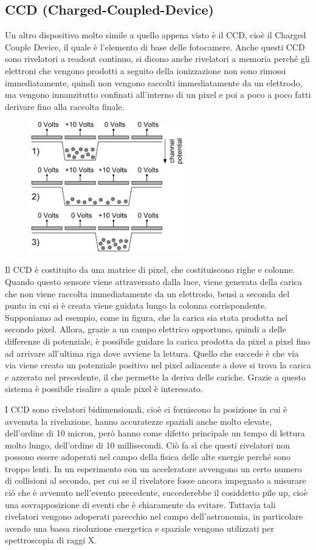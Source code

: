 \subsection{CCD (Charged-Coupled-Device)}
Un altro dispositivo molto simile a quello appena visto è il CCD, cioè il Charged Couple Device, il quale è l'elemento di base delle fotocamere. Anche questi CCD sono rivelatori a readout continuo, si dicono anche rivelatori a memoria perché gli elettroni che vengono prodotti a seguito della ionizzazione non sono rimossi immediatamente, quindi non vengono raccolti immediatamente da un elettrodo, ma vengono innanzitutto confinati all'interno di un pixel e poi a poco a poco fatti derivare fino alla raccolta finale.
\begin{figure}[H]
   \centering
   \includegraphics[width=0.6\textwidth]{immagini/CCD.png}
\end{figure}
Il CCD è costituito da una matrice di pixel, che costituiscono righe e colonne. Quando questo sensore viene attraversato dalla luce, viene generata della carica che non viene raccolta immediatamente da un elettrodo, bensì a seconda del punto in cui si è creata viene guidata lungo la colonna corrispondente. Supponiamo ad esempio, come in figura, che la carica sia stata prodotta nel secondo pixel. Allora, grazie a un campo elettrico opportuno, quindi a delle differenze di potenziale, è possibile guidare la carica prodotta da pixel a pixel fino ad arrivare all'ultima riga dove avviene la lettura. Quello che succede è che via via viene creato un potenziale positivo nel pixel adiacente a dove si trova la carica e azzerato nel precedente, il che permette la deriva delle cariche. Grazie a questo sistema è possibile risalire a quale pixel è interessato.

I CCD sono rivelatori bidimensionali, cioè ci forniscono la posizione in cui è avvenuta la rivelazione, hanno accuratezze spaziali anche molto elevate, dell'ordine di 10 micron, però hanno come difetto principale un tempo di lettura molto lungo, dell'ordine di 10 millisecondi. Ciò fa sì che questi rivelatori non possono essere adoperati nel campo della fisica delle alte energie perché sono troppo lenti. In un esperimento con un acceleratore avvengono un certo numero di collisioni al secondo, per cui se il rivelatore fosse ancora impegnato a misurare ciò che è avvenuto nell'evento precedente, succederebbe il cosiddetto pile up, cioè una sovrapposizione di eventi che è chiaramente da evitare. Tuttavia tali rivelatori vengono adoperati parecchio nel campo dell'astronomia, in particolare avendo una bassa risoluzione energetica e spaziale vengono utilizzati per spettroscopia di raggi X.

